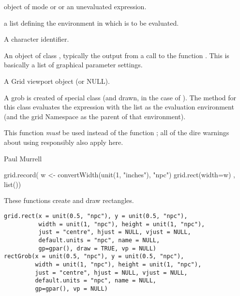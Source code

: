 %
\begin{Arguments}
\begin{ldescription}
\item[\code{expr}] object of mode  or  or
an unevaluated expression.
\item[\code{list}] a list defining the environment in which  is to
be evaluated.
\item[\code{name}]  A character identifier. 
\item[\code{gp}] An object of class , typically the output
from a call to the function .  This is basically
a list of graphical parameter settings.
\item[\code{vp}] A Grid viewport object (or NULL).
\end{ldescription}
\end{Arguments}
%
\begin{Details}\relax
A grob is created of special class 
(and drawn, in the case of ).
The  method for this class
evaluates the expression with the list as the evaluation
environment (and the grid Namespace as the parent of that
environment).
\end{Details}
%
\begin{Note}\relax
 This function \emph{must} be used instead of the
function ;  all of the dire warnings
about using  responsibly also apply here.
\end{Note}
%
\begin{Author}\relax
 Paul Murrell 
\end{Author}
%
\begin{SeeAlso}\relax
\end{SeeAlso}
%
\begin{Examples}
\begin{ExampleCode}
grid.record({
              w <- convertWidth(unit(1, "inches"), "npc")
              grid.rect(width=w)
            },
            list())
\end{ExampleCode}
\end{Examples}
%
\begin{Description}\relax
These functions create and draw rectangles.
\end{Description}
%
\begin{Usage}
\begin{verbatim}
grid.rect(x = unit(0.5, "npc"), y = unit(0.5, "npc"),
          width = unit(1, "npc"), height = unit(1, "npc"),
          just = "centre", hjust = NULL, vjust = NULL,
          default.units = "npc", name = NULL,
          gp=gpar(), draw = TRUE, vp = NULL)
rectGrob(x = unit(0.5, "npc"), y = unit(0.5, "npc"),
         width = unit(1, "npc"), height = unit(1, "npc"),
         just = "centre", hjust = NULL, vjust = NULL, 
         default.units = "npc", name = NULL,
         gp=gpar(), vp = NULL)
\end{verbatim}
\end{Usage}
